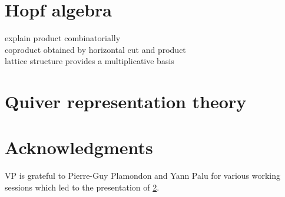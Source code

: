 \documentclass{amsart}
\theoremstyle{definition}
\begin{document}
\section{Hopf algebra}
\label{sec:HopfAlgebra}

explain product combinatorially \\
coproduct obtained by horizontal cut and product \\
lattice structure provides a multiplicative basis


\section{Quiver representation theory}
\label{subsec:representationTheory}


\section*{Acknowledgments}

VP is grateful to Pierre-Guy Plamondon and Yann Palu for various working sessions which led to the presentation of \cref{subsec:representationTheory}.




\label{sec:biblio}
\end{document}
